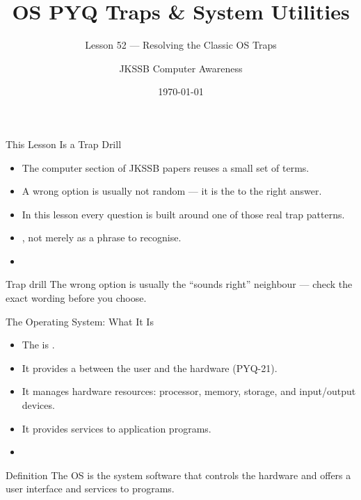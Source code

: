 \documentclass[aspectratio=169]{beamer}
\title{OS PYQ Traps \& System Utilities}
\subtitle{Lesson 52 --- Resolving the Classic OS Traps}
\author{JKSSB Computer Awareness}
\date{\today}
\begin{document}
\frame{\titlepage}

\begin{frame}{This Lesson Is a Trap Drill}
  \begin{itemize}
    \item The computer section of JKSSB papers reuses a small set of
       terms.
    \item A wrong option is usually not random --- it is the  to the right answer.
    \item In this lesson every question is built around one of those real
      trap patterns.
    \item {}, not merely as a
      phrase to recognise.
    \item {}
  \end{itemize}
  \begin{alertblock}{Trap drill}
    The wrong option is usually the ``sounds right'' neighbour --- check the
    exact wording before you choose.
  \end{alertblock}
\end{frame}

\begin{frame}{The Operating System: What It Is}
  \begin{itemize}
    \item The  is .
    \item It provides a  between the user and
      the hardware (PYQ-21).
    \item It manages hardware resources: processor, memory, storage, and
      input/output devices.
    \item It provides services to application programs.
    \item {}
  \end{itemize}
  \begin{block}{Definition}
    The OS is the system software that controls the hardware and offers a
    user interface and services to programs.
  \end{block}
\end{frame}
\end{document}
